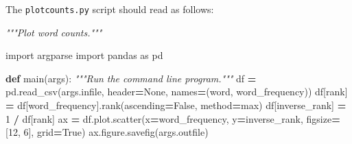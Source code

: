 \documentclass[
]{krantz}
\makeatletter
\newenvironment{Shaded}{\begin{snugshade}}{\end{snugshade}}
\newcommand{\CommentTok}[1]{\textcolor[rgb]{0.56,0.35,0.01}{\textit{#1}}}
\newcommand{\DecValTok}[1]{\textcolor[rgb]{0.00,0.00,0.81}{#1}}
\newcommand{\ImportTok}[1]{#1}
\newcommand{\KeywordTok}[1]{\textcolor[rgb]{0.13,0.29,0.53}{\textbf{#1}}}
\newcommand{\NormalTok}[1]{#1}
\newcommand{\OperatorTok}[1]{\textcolor[rgb]{0.81,0.36,0.00}{\textbf{#1}}}
\newcommand{\StringTok}[1]{\textcolor[rgb]{0.31,0.60,0.02}{#1}}
\newcommand{\VariableTok}[1]{\textcolor[rgb]{0.00,0.00,0.00}{#1}}
\newenvironment{kframe}{%
\medskip{}
\setlength{\fboxsep}{.8em}
 \def\at@end@of@kframe{}%
 \ifinner\ifhmode%
  \def\at@end@of@kframe{\end{minipage}}%
  \begin{minipage}{\columnwidth}%
 \fi\fi%
 \def\FrameCommand##1{\hskip\@totalleftmargin \hskip-\fboxsep
 \colorbox{shadecolor}{##1}\hskip-\fboxsep
     \hskip-\linewidth \hskip-\@totalleftmargin \hskip\columnwidth}%
 \MakeFramed {\advance\hsize-\width
   \@totalleftmargin\z@ \linewidth\hsize
   \@setminipage}}%
 {\par\unskip\endMakeFramed%
 \at@end@of@kframe}
\renewenvironment{Shaded}{\begin{kframe}}{\end{kframe}}
\makeatother
\begin{document}
The \texttt{plotcounts.py} script should read as follows:

\begin{Shaded}
\begin{Highlighting}[]
\CommentTok{"""Plot word counts."""}

\ImportTok{import}\NormalTok{ argparse}
\ImportTok{import}\NormalTok{ pandas }\ImportTok{as}\NormalTok{ pd}


\KeywordTok{def}\NormalTok{ main(args):}
    \CommentTok{"""Run the command line program."""}
\NormalTok{    df }\OperatorTok{=}\NormalTok{ pd.read\_csv(args.infile, header}\OperatorTok{=}\VariableTok{None}\NormalTok{, names}\OperatorTok{=}\NormalTok{(}\StringTok{\textquotesingle{}word\textquotesingle{}}\NormalTok{, }\StringTok{\textquotesingle{}word\_frequency\textquotesingle{}}\NormalTok{))}
\NormalTok{    df[}\StringTok{\textquotesingle{}rank\textquotesingle{}}\NormalTok{] }\OperatorTok{=}\NormalTok{ df[}\StringTok{\textquotesingle{}word\_frequency\textquotesingle{}}\NormalTok{].rank(ascending}\OperatorTok{=}\VariableTok{False}\NormalTok{, method}\OperatorTok{=}\StringTok{\textquotesingle{}max\textquotesingle{}}\NormalTok{)}
\NormalTok{    df[}\StringTok{\textquotesingle{}inverse\_rank\textquotesingle{}}\NormalTok{] }\OperatorTok{=} \DecValTok{1} \OperatorTok{/}\NormalTok{ df[}\StringTok{\textquotesingle{}rank\textquotesingle{}}\NormalTok{]}
\NormalTok{    ax }\OperatorTok{=}\NormalTok{ df.plot.scatter(x}\OperatorTok{=}\StringTok{\textquotesingle{}word\_frequency\textquotesingle{}}\NormalTok{, y}\OperatorTok{=}\StringTok{\textquotesingle{}inverse\_rank\textquotesingle{}}\NormalTok{,}
\NormalTok{                         figsize}\OperatorTok{=}\NormalTok{[}\DecValTok{12}\NormalTok{, }\DecValTok{6}\NormalTok{], grid}\OperatorTok{=}\VariableTok{True}\NormalTok{)}
\NormalTok{    ax.figure.savefig(args.outfile)}



\end{Highlighting}
\end{Shaded}
\end{document}
